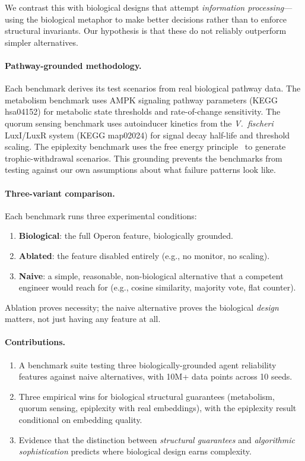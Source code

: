 We contrast this with biological designs that attempt
\emph{information processing}---using the biological metaphor to make
better decisions rather than to enforce structural invariants.  Our
hypothesis is that these do not reliably outperform simpler
alternatives.

\paragraph{Pathway-grounded methodology.}
Each benchmark derives its test scenarios from real biological pathway
data.  The metabolism benchmark uses AMPK signaling pathway parameters
(KEGG hsa04152) for metabolic state thresholds and rate-of-change
sensitivity.  The quorum sensing benchmark uses autoinducer kinetics
from the \emph{V.~fischeri} LuxI/LuxR system (KEGG map02024) for
signal decay half-life and threshold scaling.  The epiplexity
benchmark uses the free energy principle~\cite{friston2010} to
generate trophic-withdrawal scenarios.  This grounding prevents the
benchmarks from testing against our own assumptions about what failure
patterns look like.

\paragraph{Three-variant comparison.}
Each benchmark runs three experimental conditions:
\begin{enumerate}[nosep]
  \item \textbf{Biological}: the full Operon feature, biologically grounded.
  \item \textbf{Ablated}: the feature disabled entirely (e.g., no monitor, no scaling).
  \item \textbf{Naive}: a simple, reasonable, non-biological alternative
        that a competent engineer would reach for (e.g., cosine similarity,
        majority vote, flat counter).
\end{enumerate}
Ablation proves necessity; the naive alternative proves the biological
\emph{design} matters, not just having any feature at all.

\paragraph{Contributions.}
\begin{enumerate}[nosep]
  \item A benchmark suite testing three biologically-grounded agent
        reliability features against naive alternatives, with 10M+
        data points across 10 seeds.
  \item Three empirical wins for biological structural guarantees
        (metabolism, quorum sensing, epiplexity with real embeddings),
        with the epiplexity result conditional on embedding quality.
  \item Evidence that the distinction between \emph{structural
        guarantees} and \emph{algorithmic sophistication} predicts
        where biological design earns complexity.
\end{enumerate}
